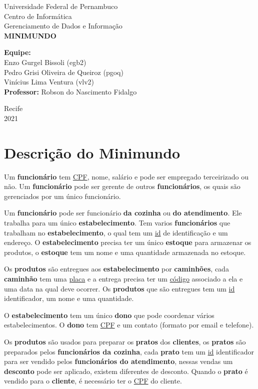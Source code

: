 \documentclass[12pt, a4paper]{article}
\begin{document}
\begin{titlepage}
\begin{center}
{\large Universidade Federal de Pernambuco}\\[0.2cm]
{\large Centro de Informática}\\[0.2cm]
{\large Gerenciamento de Dados e Informação}\\[3.7cm]
{\bf \huge MINIMUNDO}\\[5.cm]
\end{center}
{\large {\bf Equipe:}\\[0.2cm]
Enzo Gurgel Bissoli (egb2)\\[0.2cm]
Pedro Grisi Oliveira de Queiroz (pgoq)\\[0.2cm]
Vinícius Lima Ventura (vlv2)\\[0.2cm]}
{\large {\bf Professor:} Robson do Nascimento Fidalgo}\\[2cm]
\begin{center}
{\large Recife}\\[0.2cm]
{\large 2021}\\[0.2cm]
\end{center}
\end{titlepage}
\onehalfspacing
\section{Descrição do Minimundo}

Um \textbf{funcionário} tem \underline{CPF}, nome, salário e pode ser empregado terceirizado ou não.  Um \textbf{funcionário} pode ser gerente de outros \textbf{funcionários}, os quais são gerenciados por um único funcionário.

Um \textbf{funcionário} pode ser funcionário \textbf{da cozinha} ou \textbf{do atendimento}. Ele trabalha para um único \textbf{estabelecimento}. Tem varios \textbf{funcionários} que trabalham no \textbf{estabelecimento}, o qual tem um \underline{id} de identificação e um endereço. O \textbf{estabelecimento} precisa ter um único \textbf{estoque} para armazenar os produtos, o \textbf{estoque} tem um nome e uma quantidade armazenada no estoque.

Os \textbf{produtos} são entregues aos \textbf{estabelecimento} por \textbf{caminhões}, cada \textbf{caminhão} tem uma \underline{placa} e a entrega precisa ter um \underline{código} associado a ela e uma data na qual deve ocorrer. Os \textbf{produtos} que são entregues tem um \underline{id} identificador, um nome e uma quantidade.

O \textbf{estabelecimento} tem um único \textbf{dono} que pode coordenar vários estabelecimentos. O \textbf{dono} tem \underline{CPF} e um contato (formato por email e telefone).

Os \textbf{produtos} são usados para preparar os \textbf{pratos} dos \textbf{clientes}, os \textbf{pratos} são preparados pelos \textbf{funcionários da cozinha}, cada \textbf{prato} tem um \underline{id} identificador para ser vendido pelos \textbf{funcionários do atendimento}, nessas vendas um \textbf{desconto} pode ser aplicado, existem diferentes  de desconto. Quando o \textbf{prato} é vendido para o \textbf{cliente}, é necessário ter o \underline{CPF} do cliente.
\end{document}
